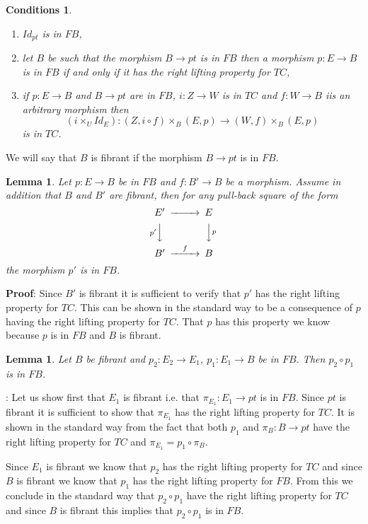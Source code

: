 \documentclass[12pt]{article}
\newenvironment{myproof}{{\bf Proof}:}{\vskip 5mm }
\newtheorem{lemma}[proposition]{Lemma}
\newtheorem{cond}[proposition]{Conditions}
\newcommand{\llabel}[1]{\label{#1}}
\newcommand{\sr}{\rightarrow}
\begin{document}
%
\begin{cond}\llabel{2015.05.22.cond1}
%
\begin{enumerate}
\item $Id_{pt}$ is in $FB$,
\item let $B$ be such that the morphism $B\sr pt$ is in $FB$ then a morphism $p:E\sr B$ is in $FB$ if and only if it has the right lifting property for $TC$,
\item if $p:E\sr B$ and $B\sr pt$ are in $FB$, $i:Z\sr W$ is in $TC$ and $f:W\sr B$ iis an arbitrary morphism then
%
$$(i\times_U Id_E):(Z,i\circ f)\times_B (E,p)\sr (W,f)\times_B (E,p)$$
%
is in $TC$.
%
\end{enumerate}
\end{cond}
%
We will say that $B$ is fibrant if the morphism $B\sr pt$ is in $FB$. 
%
\begin{lemma}
\llabel{2015.05.14.l2}
Let $p:E\sr B$ be in $FB$ and $f:B'\sr B$ be a morphism. Assume in addition that $B$ and $B'$ are fibrant, then for any pull-back square of the form
%
$$
\begin{CD}
E' @>>> E\\
@Vp' VV @VV p V\\
B' @>f>> B
\end{CD}
$$
%
the morphism $p'$ is in $FB$. 
\end{lemma}
%
\begin{myproof}
Since $B'$ is fibrant it is sufficient to verify that $p'$ has the right lifting property for $TC$. This can be shown in the standard way to be a consequence of $p$ having the right lifting property for $TC$. That $p$ has this property we know because $p$ is in $FB$ and $B$ is fibrant.
\end{myproof}
%
\begin{lemma}
\llabel{2015.05.14.l4}
Let $B$ be fibrant and $p_2:E_2\sr E_1$, $p_1:E_1\sr B$ be in $FB$. Then $p_2\circ p_1$ is in $FB$.
\end{lemma}
%
\begin{myproof}
Let us show first that $E_1$ is fibrant i.e. that $\pi_{E_1}:E_1\sr pt$ is in $FB$. Since $pt$ is fibrant it is sufficient to show that $\pi_{E_1}$ has the right lifting property for $TC$. It is shown in the standard way from the fact that both $p_1$ and $\pi_B:B\sr pt$ have the right lifting property for $TC$ and $\pi_{E_1}=p_1\circ \pi_B$. 

Since $E_1$ is fibrant we know that $p_2$ has the right lifting property for $TC$ and since $B$ is fibrant we know that $p_1$ has the right lifting property for $FB$. From this we conclude in the standard way that $p_2\circ p_1$ have the right lifting property for $TC$ and since $B$ is fibrant this implies that $p_2\circ p_1$ is in $FB$.
\end{myproof}
\end{document}
